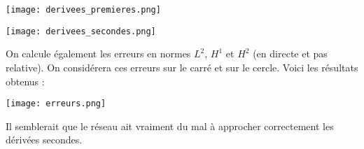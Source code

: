 \begin{minipage}{0.48\linewidth}
	\centering
	\texttt{[image: derivees\_premieres.png]}
\end{minipage}
\begin{minipage}{0.48\linewidth}
	\centering
	\texttt{[image: derivees\_secondes.png]}
\end{minipage}

\newpage

On calcule également les erreurs en normes $L^2$, $H^1$ et $H^2$ (en directe et pas relative). On considérera ces erreurs sur le carré et sur le cercle. Voici les résultats obtenus :

\begin{minipage}{\linewidth}
	\centering
	\texttt{[image: erreurs.png]}
\end{minipage}

\begin{Rem}
	Il semblerait que le réseau ait vraiment du mal à approcher correctement les dérivées secondes.
\end{Rem}


